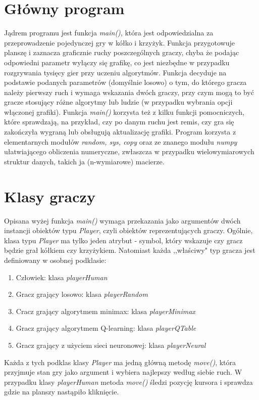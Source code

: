 \documentclass[licencjacka]{pracamgr}
\begin{document}
\section{Główny program}
Jądrem programu jest funkcja \textit{main()}, która jest odpowiedzialna za przeprowadzenie pojedynczej gry w kółko i krzyżyk. Funkcja przygotowuje planszę i zaznacza graficznie ruchy poszczególnych graczy, chyba że podając odpowiedni parametr wyłączy się grafikę, co jest niezbędne w przypadku rozgrywania tysięcy gier przy uczeniu algorytmów. Funkcja decyduje na podstawie podanych parametrów (domyślnie losowo) o tym, do którego gracza należy pierwszy ruch i wymaga wskazania dwóch graczy, przy czym mogą to być gracze stosujący różne algorytmy lub ludzie (w przypadku wybrania opcji włączonej grafiki). Funkcja \textit{main()} korzysta też z kilku funkcji pomocniczych, które sprawdzają, na przykład, czy po danym ruchu jest remis, czy gra się zakończyła wygraną  lub obsługują aktualizację grafiki. Program korzysta z elementarnych modułów \textit{random, sys, copy} oraz ze znanego modułu \textit{numpy} ułatwiającego obliczenia numeryczne, zwłaszcza w przypadku wielowymiarowych struktur danych, takich ja (n-wymiarowe) macierze.  

\section{Klasy graczy}
Opisana wyżej funkcja \textit{main()} wymaga przekazania jako argumentów dwóch instancji obiektów typu \textit{Player}, czyli obiektów reprezentujących graczy. Ogólnie, klasa typu \textit{Player} ma tylko jeden atrybut - symbol, który wskazuje czy gracz będzie grał kółkiem czy krzyżykiem. Natomiast każda ,,właściwy" typ gracza jest definiowany w osobnej podklasie:
\begin{enumerate}
	\item{Człowiek: klasa \textit{playerHuman}}
	\item{Gracz grający losowo: klasa \textit{playerRandom}}	
	\item{Cracz grający algorytmem minimax: klasa \textit{playerMinimax}}
	\item{Gracz grający algorytmem Q-learning: klasa \textit{playerQTable}}
	\item{Gracz grający z użyciem sieci neuronowej: klasa \textit{playerNeural}}
\end{enumerate}
Każda z tych podklas klasy \textit{Player} ma jedną główną metodę \textit{move()}, która przyjmuje stan  gry jako argument i wybiera najlepszy według siebie ruch. W przypadku klasy \textit{playerHuman} metoda \textit{move()} śledzi pozycję kursora i sprawdza gdzie na  planszy nastąpiło kliknięcie.  \\
\end{document}

